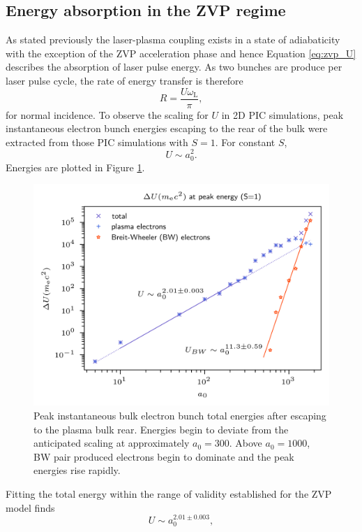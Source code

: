 \subsection{Energy absorption in the ZVP regime}\label{sec:zvp-energyabsorption}
As stated previously the laser-plasma coupling exists in a state of adiabaticity with the exception of the ZVP acceleration phase and hence Equation \ref{eq:zvp_U} describes the absorption of laser pulse energy. As two bunches are produce per laser pulse cycle, the rate of energy transfer is therefore
\begin{equation}\label{eq:zvp-rate}
	R = \frac{U\omega_\mathrm{L}}{\pi},
\end{equation}
for normal incidence. To observe the scaling for $U$ in 2D PIC simulations, peak instantaneous electron bunch energies escaping to the rear of the bulk were extracted from those PIC simulations with $S=1$. For constant $S$, 
\begin{equation}
	U \sim a^2_0.
\end{equation}
Energies are plotted in Figure \ref{fig:zvppeakgamma}.
\begin{figure}
	\centering
	\includegraphics[width=0.7\linewidth]{figures/zvp/zvp_peak_gamma}
	\caption[Peak instantaneous bulk electron bunch total energy escaping to the plasma bulk rear.]{Peak instantaneous bulk electron bunch total energies after escaping to the plasma bulk rear. Energies begin to deviate from the anticipated scaling at approximately $a_0 = 300$. Above $a_0 = 1000$, BW pair produced electrons begin to dominate and the peak energies rise rapidly.}
	\label{fig:zvppeakgamma}
\end{figure}
Fitting the total energy within the range of validity established for the ZVP model finds
\begin{equation}
	U \sim a^{2.01\pm0.003}_0,
\end{equation}
